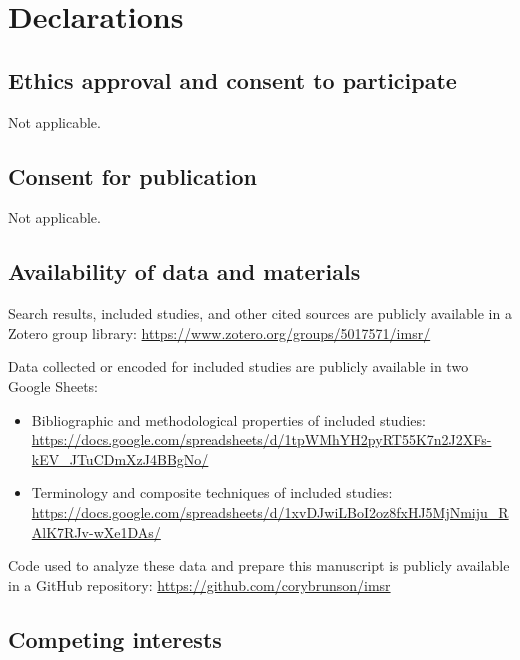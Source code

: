 \documentclass[sn-mathphys,Numbered,pdflatex]{sn-jnl}
\theoremstyle{remark}
\theoremstyle{definition}
\providecommand{\tightlist}{%
  \setlength{\itemsep}{0pt}\setlength{\parskip}{0pt}}
\begin{document}
\section*{Declarations}\label{declarations}

\subsection*{Ethics approval and consent to
participate}\label{ethics-approval-and-consent-to-participate}

Not applicable.

\subsection*{Consent for publication}\label{consent-for-publication}

Not applicable.

\subsection*{Availability of data and
materials}\label{availability-of-data-and-materials}

Search results, included studies, and other cited sources are publicly
available in a Zotero group library:
\url{https://www.zotero.org/groups/5017571/imsr/}

Data collected or encoded for included studies are publicly available in
two Google Sheets:

\begin{itemize}
\tightlist
\item
  Bibliographic and methodological properties of included studies:
  \url{https://docs.google.com/spreadsheets/d/1tpWMhYH2pyRT55K7n2J2XFs-kEV_JTuCDmXzJ4BBgNo/}
\item
  Terminology and composite techniques of included studies:
  \url{https://docs.google.com/spreadsheets/d/1xvDJwiLBoI2oz8fxHJ5MjNmiju_RAlK7RJv-wXe1DAs/}
\end{itemize}

Code used to analyze these data and prepare this manuscript is publicly
available in a GitHub repository:
\url{https://github.com/corybrunson/imsr}

\subsection*{Competing interests}\label{competing-interests}
\end{document}
